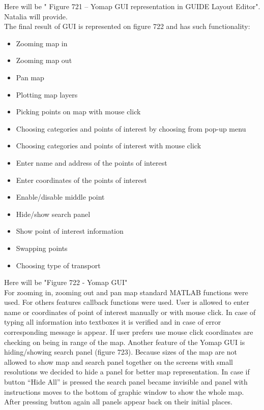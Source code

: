 			Here will be " Figure 721 – Yomap GUI representation in GUIDE Layout Editor". Natalia will provide.\\
			
			The final result of GUI is represented on figure 722 and has such functionality: 
			\begin{itemize}
				\item Zooming map in
				\item Zooming map out
				\item Pan map
				\item Plotting map layers
				\item Picking points on map with mouse click
				\item Choosing categories and points of interest by choosing from pop-up menu
				\item Choosing categories and points of interest with mouse click
				\item Enter name and address of the points of interest
				\item Enter coordinates of the points of interest
				\item Enable/disable middle point
				\item Hide/show search panel
				\item Show point of interest information
				\item Swapping points
				\item Choosing type of transport  
			\end{itemize}
			
			Here will be "Figure 722 - Yomap GUI"\\
			
			For zooming in, zooming out and pan map standard MATLAB functions were used. For others features callback functions were used. 
			User is allowed to enter name or coordinates of point of interest manually or with mouse click. In case of typing all information into textboxes it is verified and in case of error corresponding message is appear. If user prefers use mouse click coordinates are checking on being in range of the map.
			Another feature of the Yomap GUI is hiding/showing search panel (figure 723). Because sizes of the map are not allowed to show map and search panel together on the screens with small resolutions we decided to hide a panel for better map representation. In case if button “Hide All” is pressed the search panel became invisible and panel with instructions moves to the bottom of graphic window to show the whole map. After pressing button again all panels appear back on their initial places. 
			
